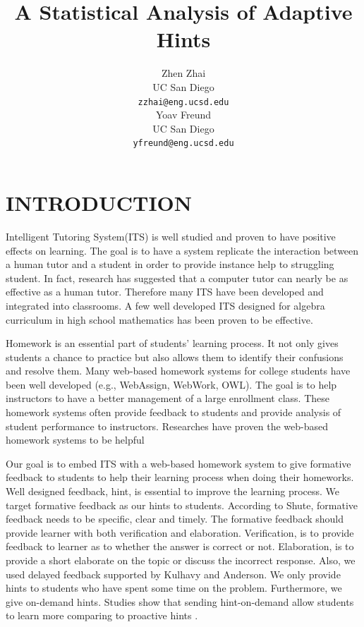 \documentclass{article} %
\title{\LARGE \bf
A Statistical Analysis of Adaptive Hints}
\author{ \parbox{2 in}{\centering Zhen Zhai \\
         UC San Diego\\
         {\tt\small zzhai@eng.ucsd.edu}}
         \parbox{2 in}{ \centering Yoav Freund \\
        UC San Diego\\
         {\tt\small yfreund@eng.ucsd.edu}}
}
\begin{document}
\nipsfinalcopy


\maketitle
\thispagestyle{empty}
\pagestyle{empty}


\begin{abstract}

\end{abstract}


\section{INTRODUCTION}
Intelligent Tutoring System(ITS) is well studied and proven to have positive effects on learning\cite{Anderson1995}. The goal is to have a system replicate the interaction between a human tutor and a student in order to provide instance help to struggling student. In fact, research has suggested that a computer tutor can nearly be as effective as a human tutor\cite{Vanlehn2011}. Therefore many ITS have been developed and integrated into classrooms. A few well developed ITS designed for algebra curriculum in high school mathematics has been proven to be effective\cite{Koedinger1997}\cite{John2014}.

Homework is an essential part of students' learning process\cite{Cooper2006}. It not only gives students a chance to practice but also allows them to identify their confusions and resolve them. Many web-based homework systems for college students have been well developed (e.g., WebAssign, WebWork, OWL). The goal is to help instructors to have a better management of a large enrollment class. These homework systems often provide feedback to students and provide analysis of student performance to instructors. Researches have proven the web-based homework systems to be helpful\cite{MestHartRath2002}\cite{Vanlehn2005}

Our goal is to embed ITS with a web-based homework system to give formative feedback to students to help their learning process when doing their homeworks. Well designed feedback, hint, is essential to improve the learning process\cite{Azevedo1995}\cite{Bangert-Drowns1991}. We target formative feedback as our hints to students. According to Shute, formative feedback needs to be specific, clear and timely\cite{Shute2008}. The formative feedback should provide learner with both verification and elaboration\cite{Mason2001}\cite{Bangert-Drowns1991}. Verification, is to provide feedback to learner as to whether the answer is correct or not. Elaboration, is to provide a short elaborate on the topic or discuss the incorrect response. Also, we used delayed feedback supported by Kulhavy and Anderson\cite{Kulhavy1972}. We only provide hints to students who have spent some time on the problem. Furthermore, we give on-demand hints. Studies show that sending hint-on-demand allow students to learn more comparing to proactive hints \cite{Razzaq2010}.
\end{document}
